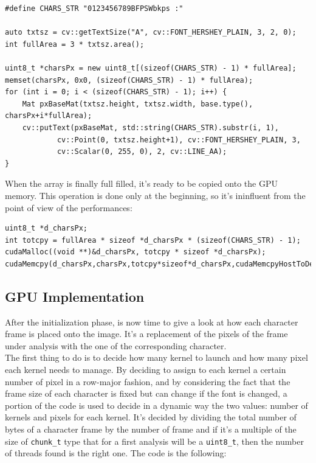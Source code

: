 \documentclass[paper=a4, fontsize=10pt]{scrartcl}	%
\begin{document}
	\begin{lstlisting}[style=CStyle]
#define CHARS_STR "0123456789BFPSWbkps :"

auto txtsz = cv::getTextSize("A", cv::FONT_HERSHEY_PLAIN, 3, 2, 0);
int fullArea = 3 * txtsz.area();
	
uint8_t *charsPx = new uint8_t[(sizeof(CHARS_STR) - 1) * fullArea];
memset(charsPx, 0x0, (sizeof(CHARS_STR) - 1) * fullArea);
for (int i = 0; i < (sizeof(CHARS_STR) - 1); i++) {
	Mat pxBaseMat(txtsz.height, txtsz.width, base.type(), charsPx+i*fullArea);
	cv::putText(pxBaseMat, std::string(CHARS_STR).substr(i, 1),
			cv::Point(0, txtsz.height+1), cv::FONT_HERSHEY_PLAIN, 3,
			cv::Scalar(0, 255, 0), 2, cv::LINE_AA);
}\end{lstlisting}

When the array is finally full filled, it's ready to be copied onto the GPU memory. This operation is done only at the beginning, so it's ininfluent from the point of view of the performances:

	\begin{lstlisting}[style=CStyle]
uint8_t *d_charsPx;
int totcpy = fullArea * sizeof *d_charsPx * (sizeof(CHARS_STR) - 1);
cudaMalloc((void **)&d_charsPx, totcpy * sizeof *d_charsPx);
cudaMemcpy(d_charsPx,charsPx,totcpy*sizeof*d_charsPx,cudaMemcpyHostToDev);
\end{lstlisting}

\subsection{GPU Implementation}
After the initialization phase, is now time to give a look at how each character frame is placed onto the image. It's a replacement of the pixels of the frame under analysis with the one of the corresponding character.\\

The first thing to do is to decide how many kernel to launch and how many pixel each kernel needs to manage. By deciding to assign to each kernel a certain number of pixel in a row-major fashion, and by considering the fact that the frame size of each character is fixed but can change if the font is changed, a portion of the code is used to decide in a dynamic way the two values: number of kernels and pixels for each kernel. It's decided by dividing the total number of bytes of a character frame by the number of frame and if it's a multiple of the size of \texttt{chunk\_t} type that for a first analysis will be a \texttt{uint8\_t}, then the number of threads found is the right one. The code is the following:
\end{document}
